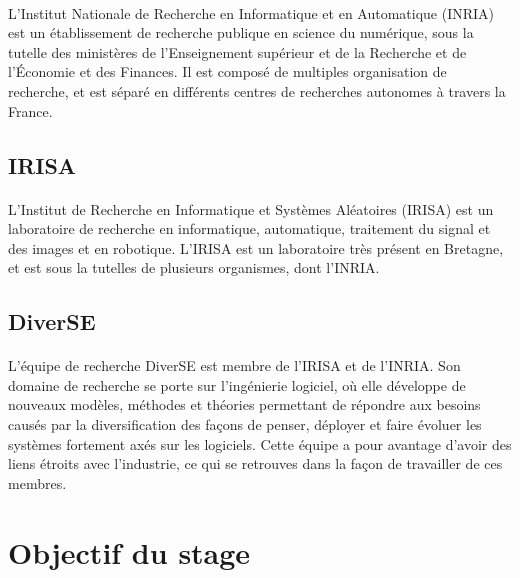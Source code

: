 \documentclass[11pt, a4paper, pdftex]{article}
\begin{document}
            \paragraph{}
                L'Institut Nationale de Recherche en Informatique et en Automatique (INRIA) est un établissement de recherche publique en science du numérique,
                sous la tutelle des ministères de l'Enseignement supérieur et de la Recherche et de l'Économie et des Finances.
                Il est composé de multiples organisation de recherche, et est séparé en différents centres de recherches autonomes à travers la France.
    \vspace{1cm}
    \subsection{IRISA}\label{subsec:irisa}
            \paragraph{}
                L'Institut de Recherche en Informatique et Systèmes Aléatoires (IRISA) est un laboratoire de recherche en informatique, automatique,
                traitement du signal et des images et en robotique.
                L'IRISA est un laboratoire très présent en Bretagne, et est sous la tutelles de plusieurs organismes, dont l'INRIA\@.
    \vspace{1cm}
    \subsection{DiverSE}\label{subsec:diverse}
             \paragraph{}
                L'équipe de recherche DiverSE est membre de l'IRISA et de l'INRIA. Son domaine de recherche se porte sur l'ingénierie logiciel, où elle développe de nouveaux modèles,
                méthodes et théories permettant de répondre aux besoins causés par la diversification des façons de penser, déployer et faire évoluer les systèmes fortement axés sur les logiciels.
                Cette équipe a pour avantage d'avoir des liens étroits avec l'industrie, ce qui se retrouves dans la façon de travailler de ces membres.
    \newpage
    \section{Objectif du stage}\label{sec:objsta}
    \vspace{1cm}
\end{document}
